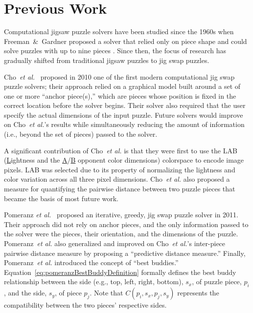 \chapter{Previous Work}\label{chap:previousWork}

Computational jigsaw puzzle solvers have been studied since the 1960s when Freeman~\&~Gardner proposed a solver that relied only on piece shape and could solve puzzles with up to nine pieces \cite{freeman1964}.  Since then, the focus of research has gradually shifted from traditional jigsaw puzzles to jig swap puzzles.  

Cho~\textit{et al.}~\cite{cho2010} proposed in 2010 one of the first modern computational jig swap puzzle solvers; their approach relied on a graphical model built around a set of one or more ``anchor piece(s),'' which are pieces whose position is fixed in the correct location before the solver begins.  Their solver also required that the user specify the actual dimensions of the input puzzle.  Future solvers would improve on Cho~\textit{et al.}'s results while simultaneously reducing the amount of information (i.e., beyond the set of pieces) passed to the solver.

A significant contribution of Cho~\textit{et al.} is that they were first to use the LAB  (\underline{L}ightness and the \underline{A}/\underline{B} opponent color dimensions) colorspace to encode image pixels.  LAB was selected due to its property of normalizing the lightness and color variation across all three pixel dimensions.  Cho~\textit{et al.} also proposed a measure for quantifying the pairwise distance between two puzzle pieces that became the basis of most future work.  

Pomeranz \textit{et al.}~\cite{pomeranz2011} proposed an iterative, greedy, jig swap puzzle solver in 2011.  Their approach did not rely on anchor pieces, and the only information passed to the solver were the pieces, their orientation, and the dimensions of the puzzle.  Pomeranz~\textit{et al.} also generalized and improved on Cho~\textit{et al.}'s inter-piece pairwise distance measure by proposing a ``predictive distance measure.''  Finally, Pomeranz~\textit{et al.} introduced the concept of ``best buddies.'' Equation~\ref{eq:pomeranzBestBuddyDefinition} formally defines the best buddy relationship between the side (e.g., top, left, right, bottom), $s_x$, of puzzle piece, $p_i$, and the side, $s_y$, of piece $p_j$.  Note that $C(p_i, s_x, p_j, s_y)$ represents the compatibility between the two pieces' respective sides.

